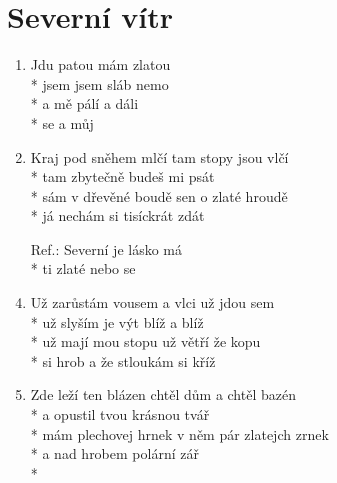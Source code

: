 \section{Severní vítr}
\begin{enumerate}
\item Jdu  patou mám  zlatou \\*
jsem  jsem sláb nemo \\*
a  mě pálí a  dáli \\*
se a  můj    
\item Kraj pod sněhem mlčí tam stopy jsou vlčí \\*
tam zbytečně budeš mi psát \\*
sám v dřevěné boudě sen o zlaté hroudě \\*
já nechám si tisíckrát zdát 
\item[Ref.:] Severní  je   lásko má  \\*
 ti  zlaté  nebo se   
\item Už zarůstám vousem a vlci už jdou sem \\*
už slyším je výt blíž a blíž \\*
už mají mou stopu už větří že kopu \\*
si hrob a že stloukám si kříž 
\item Zde leží ten blázen chtěl dům a chtěl bazén \\*
a opustil tvou krásnou tvář \\*
mám plechovej hrnek v něm pár zlatejch zrnek \\*
a nad hrobem polární zář \\*
\end{enumerate}
